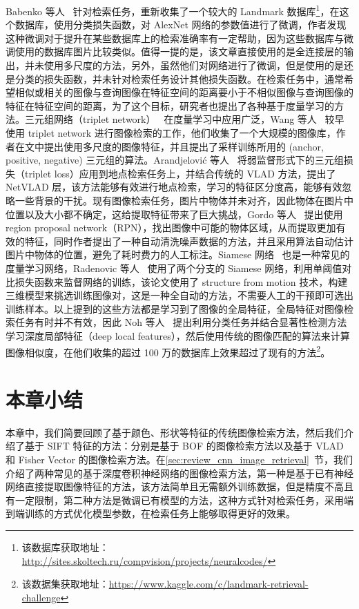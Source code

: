 Babenko 等人~\cite{Babenko2014NeuralCF} 针对检索任务，重新收集了一个较大的 Landmark 数据库\footnote{该数据库获取地址：\url{http://sites.skoltech.ru/compvision/projects/neuralcodes/}}，在这个数据库，使用分类损失函数，对 AlexNet 网络的参数值进行了微调，作者发现这种微调对于提升在某些数据库上的检索准确率有一定帮助，因为这些数据库与微调使用的数据库图片比较类似。值得一提的是，该文章直接使用的是全连接层的输出，并未使用多尺度的方法，另外，虽然他们对网络进行了微调，但是使用的是还是分类的损失函数，并未针对检索任务设计其他损失函数。在检索任务中，通常希望相似或相关的图像与查询图像在特征空间的距离要小于不相似图像与查询图像的特征在特征空间的距离，为了这个目标，研究者也提出了各种基于度量学习的方法。三元组网络（triplet network）~\cite{Wang2014LearningFI,Schroff2015FaceNetAU} 在度量学习中应用广泛，Wang 等人~\cite{Wang2014LearningFI} 较早使用 triplet network 进行图像检索的工作，他们收集了一个大规模的图像库，作者在文中提出使用多尺度的图像特征，并且提出了采样训练所用的 (anchor, positive, negative) 三元组的算法。Arandjelovi{\'c} 等人~\cite{Arandjelovic2016NetVLADCA} 将弱监督形式下的三元组损失（triplet loss）应用到地点检索任务上，并结合传统的 VLAD 方法，提出了 NetVLAD 层，该方法能够有效进行地点检索，学习的特征区分度高，能够有效忽略一些背景的干扰。现有图像检索任务，图片中物体并未对齐，因此物体在图片中位置以及大小都不确定，这给提取特征带来了巨大挑战，Gordo 等人~\cite{Gordo2016DeepIR} 提出使用 region proposal network（RPN），找出图像中可能的物体区域，从而提取更加有效的特征，同时作者提出了一种自动清洗噪声数据的方法，并且采用算法自动估计图片中物体的位置，避免了耗时费力的人工标注。Siamese 网络~\cite{Bell2015LearningVS,Hadsell2006DimensionalityRB} 也是一种常见的度量学习网络，Radenovic 等人~\cite{Radenovic2016CNNIR} 使用了两个分支的 Siamese 网络，利用单阈值对比损失函数来监督网络的训练，该论文使用了 structure from motion 技术，构建三维模型来挑选训练图像对，这是一种全自动的方法，不需要人工的干预即可选出训练样本。以上提到的这些方法都是学习到了图像的全局特征，全局特征对图像检索任务有时并不有效，因此 Noh 等人~\cite{Noh2017LargeScaleIR} 提出利用分类任务并结合显著性检测方法学习深度局部特征（deep local features），然后使用传统的图像匹配的算法来计算图像相似度，在他们收集的超过 100 万的数据库上效果超过了现有的方法\footnote{该数据集获取地址：\url{https://www.kaggle.com/c/landmark-retrieval-challenge}}。


\section{本章小结}\label{sec:related_work_conclusion}
本章中，我们简要回顾了基于颜色、形状等特征的传统图像检索方法，然后我们介绍了基于 SIFT 特征的方法：分别是基于 BOF 的图像检索方法以及基于 VLAD 和 Fisher Vector 的图像检索方法。在\ref{sec:review_cnn_image_retrieval}~节，我们介绍了两种常见的基于深度卷积神经网络的图像检索方法，第一种是基于已有神经网络直接提取图像特征的方法，该方法简单且无需额外训练数据，但是精度不高且有一定限制，第二种方法是微调已有模型的方法，这种方式针对检索任务，采用端到端训练的方式优化模型参数，在检索任务上能够取得更好的效果。

